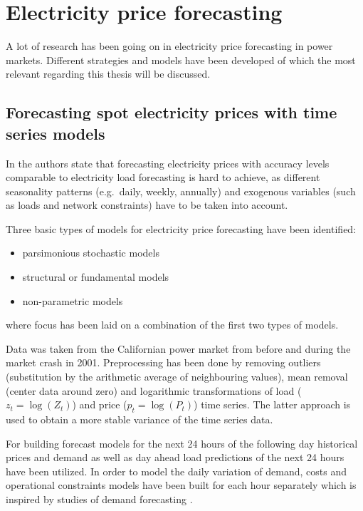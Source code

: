 

\section{Electricity price forecasting}

A lot of research has been going on in electricity price forecasting in power markets. Different strategies and models have been developed of which the most relevant regarding this thesis will be discussed. 


\subsection{Forecasting spot electricity prices with time series models}

In \cite{weron2005forecasting} the authors state that forecasting electricity prices with accuracy levels comparable to electricity load forecasting is hard to achieve, as different seasonality patterns (e.g.~daily, weekly, annually) and exogenous variables (such as loads and network constraints) have to be taken into account. 

Three basic types of models for electricity price forecasting have been identified: 

\begin{itemize}
	\item parsimonious stochastic models
	\item structural or fundamental models
	\item non-parametric models
\end{itemize}

where focus has been laid on a combination of the first two types of models. 

Data was taken from the Californian power market from before and during the market crash in 2001. Preprocessing has been done by removing outliers (substitution by the arithmetic average of neighbouring values), mean removal (center data around zero) and logarithmic transformations of load ($z_t = \log(Z_t)$) and price ($p_t = \log(P_t)$) time series. The latter approach is used to obtain a more stable variance of the time series data. 

For building forecast models for the next 24 hours of the following day historical prices and demand as well as day ahead load predictions of the next 24 hours have been utilized. In order to model the daily variation of demand, costs and operational constraints models have been built for each hour separately which is inspired by studies of demand forecasting \cite{bunn2000forecasting}. 

